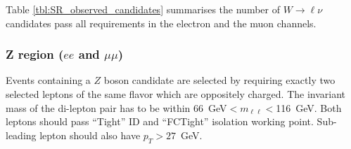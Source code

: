 Table \ref{tbl:SR_observed_candidates} summarises the number of $W \rightarrow \ell \nu$  candidates pass all requirements in the electron and the muon channels.



\subsubsection{Z region ($ee$ and $\mu\mu$)}
\label{sec:z_boson_selection_ll}

Events containing a $Z$ boson candidate are selected by requiring exactly two selected leptons of the same flavor which are oppositely charged. 
The invariant mass of the di-lepton pair has to be within 66~GeV$<m_{\ell\ell}<$116~GeV.
Both leptons should pass ``Tight'' ID and ``FCTight'' isolation working point.
Sub-leading lepton should also have $p_T>27$~GeV.

